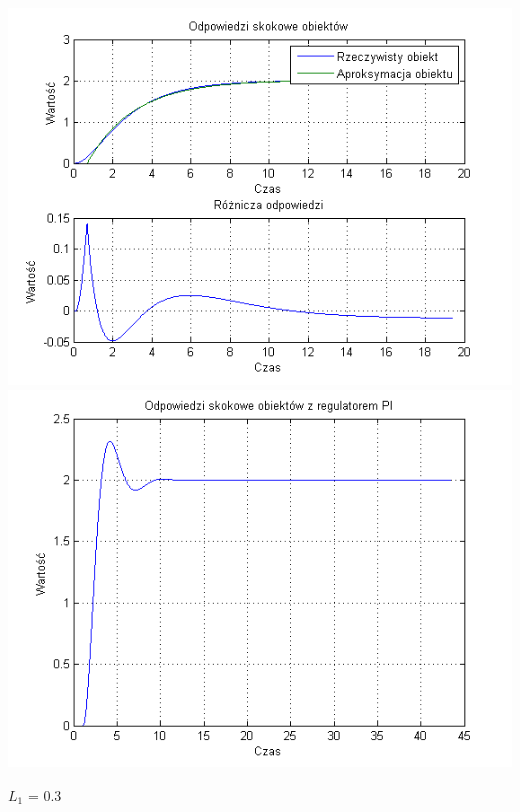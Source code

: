 \documentclass[10pt,a4paper]{article}
\begin{document}
\begin{center}
\includegraphics[scale=1]{images/jeden/skrypt_177.png}\\
\includegraphics[scale=1]{images/jeden/skrypt_178.png}\\
\end{center}
\newpage
$L_1$ = 0.3
\end{document}
